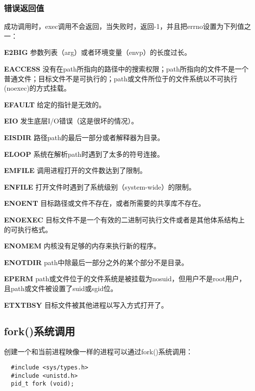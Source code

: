 \subsubsection{错误返回值}

成功调用时，exec调用不会返回，当失败时，返回-1，并且把errno设置为下列值之一：

\begin{eqlist*}
\item[\textbf{E2BIG}] 参数列表（arg）或者环境变量（envp）的长度过长。
\item[\textbf{EACCESS}] 没有在path所指向的路径中的搜索权限；path所指向的文件不是一个普通文件；目标文件不是可执行的；path或文件所位于的文件系统以不可执行(noexec)的方式挂载。
\item[\textbf{EFAULT}] 给定的指针是无效的。
\item[\textbf{EIO}] 发生底层I/O错误（这是很坏的情况）。
\item[\textbf{EISDIR}] 路径path的最后一部分或者解释器为目录。
\item[\textbf{ELOOP}] 系统在解析path时遇到了太多的符号连接。
\item[\textbf{EMFILE}] 调用进程打开的文件数达到了限制。
\item[\textbf{ENFILE}] 打开文件时遇到了系统级别（system-wide）的限制。
\item[\textbf{ENOENT}] 目标路径或文件不存在，或者所需要的共享库不存在。
\item[\textbf{ENOEXEC}] 目标文件不是一个有效的二进制可执行文件或者是其他体系结构上的可执行格式。
\item[\textbf{ENOMEM}] 内核没有足够的内存来执行新的程序。
\item[\textbf{ENOTDIR}] path中除最后一部分之外的某个部分不是目录。
\item[\textbf{EPERM}] path或文件位于的文件系统是被挂载为nosuid，但用户不是root用户，且path或文件被设置了suid或sgid位。
\item[\textbf{ETXTBSY}] 目标文件被其他进程以写入方式打开了。
\end{eqlist*}

\subsection{fork()系统调用}

创建一个和当前进程映像一样的进程可以通过fork()系统调用：

\begin{lstlisting}
  #include <sys/types.h>
  #include <unistd.h>
  pid_t fork (void);
\end{lstlisting}

